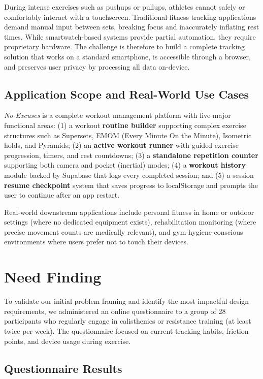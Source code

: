 \documentclass[11pt]{article}
\begin{document}
During intense exercises such as pushups or pullups, athletes cannot safely or comfortably interact with a touchscreen. Traditional fitness tracking applications demand manual input between sets, breaking focus and inaccurately inflating rest times. While smartwatch-based systems provide partial automation, they require proprietary hardware. The challenge is therefore to build a complete tracking solution that works on a standard smartphone, is accessible through a browser, and preserves user privacy by processing all data on-device.

\subsection{Application Scope and Real-World Use Cases}

\textit{No-Excuses} is a complete workout management platform with five major functional areas: (1) a workout \textbf{routine builder} supporting complex exercise structures such as Supersets, EMOM (Every Minute On the Minute), Isometric holds, and Pyramids; (2) an \textbf{active workout runner} with guided exercise progression, timers, and rest countdowns; (3) a \textbf{standalone repetition counter} supporting both camera and pocket (inertial) modes; (4) a \textbf{workout history} module backed by Supabase that logs every completed session; and (5) a session \textbf{resume checkpoint} system that saves progress to localStorage and prompts the user to continue after an app restart.

Real-world downstream applications include personal fitness in home or outdoor settings (where no dedicated equipment exists), rehabilitation monitoring (where precise movement counts are medically relevant), and gym hygiene-conscious environments where users prefer not to touch their devices.

\section{Need Finding}

To validate our initial problem framing and identify the most impactful design requirements, we administered an online questionnaire to a group of 28 participants who regularly engage in calisthenics or resistance training (at least twice per week). The questionnaire focused on current tracking habits, friction points, and device usage during exercise.

\subsection{Questionnaire Results}
\end{document}
